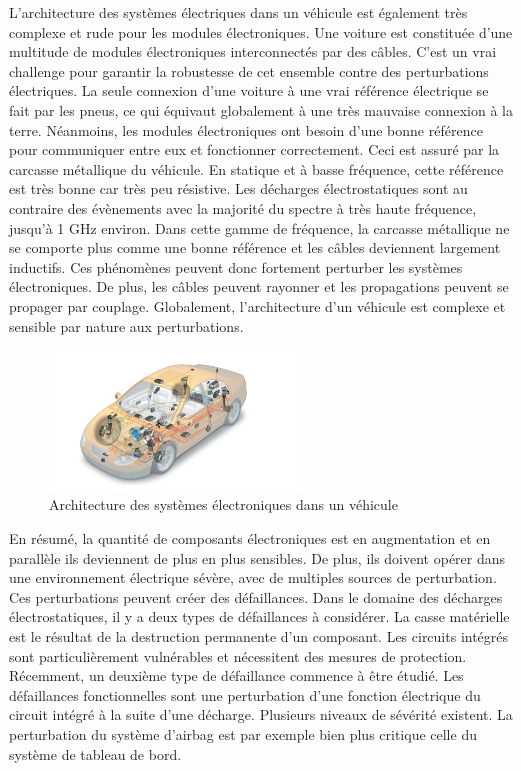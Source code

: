L'architecture des systèmes électriques dans un véhicule est également très complexe et rude pour les modules électroniques.
Une voiture est constituée d'une multitude de modules électroniques interconnectés par des câbles.
C'est un vrai challenge pour garantir la robustesse de cet ensemble contre des perturbations électriques.
La seule connexion d'une voiture à une vrai référence électrique se fait par les pneus, ce qui équivaut globalement à une très mauvaise connexion à la terre.
Néanmoins, les modules électroniques ont besoin d'une bonne référence pour communiquer entre eux et fonctionner correctement.
Ceci est assuré par la carcasse métallique du véhicule.
En statique et à basse fréquence, cette référence est très bonne car très peu résistive.
Les décharges électrostatiques sont au contraire des évènements avec la majorité du spectre à très haute fréquence, jusqu'à 1 GHz environ.
Dans cette gamme de fréquence, la carcasse métallique ne se comporte plus comme une bonne référence et les câbles deviennent largement inductifs.
Ces phénomènes peuvent donc fortement perturber les systèmes électroniques.
De plus, les câbles peuvent rayonner et les propagations peuvent se propager par couplage.
Globalement, l'architecture d'un véhicule est complexe et sensible par nature aux perturbations.

\begin{figure}[!h]
  \centering
  \includegraphics[width=0.6\textwidth]{src/1/figures/systemintegration_01_uv-data.jpg}
  \caption{Architecture des systèmes électroniques dans un véhicule \cite{car-architecture}}
  \label{fig:car-architecture}
\end{figure}

En résumé, la quantité de composants électroniques est en augmentation et en parallèle ils deviennent de plus en plus sensibles.
De plus, ils doivent opérer dans une environnement électrique sévère, avec de multiples sources de perturbation.
Ces perturbations peuvent créer des défaillances.
Dans le domaine des décharges électrostatiques, il y a deux types de défaillances à considérer.
La casse matérielle est le résultat de la destruction permanente d'un composant.
Les circuits intégrés sont particulièrement vulnérables \cite{impactESDsemiconductors} et nécessitent des mesures de protection.
Récemment, un deuxième type de défaillance commence à être étudié.
Les défaillances fonctionnelles sont une perturbation d'une fonction électrique du circuit intégré à la suite d'une décharge.
Plusieurs niveaux de sévérité existent.
La perturbation du système d'airbag est par exemple bien plus critique celle du système de tableau de bord.

